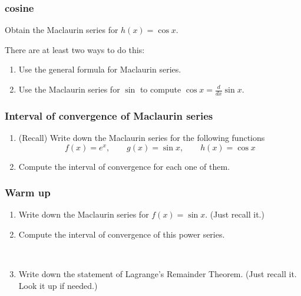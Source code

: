 \documentclass[14pt]{beamer}
\begin{document}
\begin{frame}[t]
	\frametitle{cosine}

	Obtain the Maclaurin series for $h(x) = \cos x$.

	There are at least two ways to do this:
	\vspace{.2cm}
	\begin{enumerate}
		\item Use the general formula for Maclaurin series.
			\vspace{.2cm}

		\item Use the Maclaurin series for $\sin$ to compute $\displaystyle \cos x =
			\frac{d}{dx}\sin x$.
	\end{enumerate}
\end{frame}

\begin{frame}[t]
	\frametitle{Interval of convergence of Maclaurin series}

	\begin{enumerate}
		\item (Recall) Write down the Maclaurin series for the following functions
			\[
				f(x) = e^{x}, \quad \quad g(x) = \sin x, \quad \quad h(x) = \cos x
			\]

		\item Compute the interval of convergence for each one of them.
	\end{enumerate}
\end{frame}

\begin{frame}[t]
	\frametitle{Warm up}

	\begin{enumerate}
		\item Write down the Maclaurin series for $\displaystyle f(x)=\sin x$. (Just
			recall it.)

		\item Compute the interval of convergence of this power series.

			\

		\item Write down the statement of Lagrange's Remainder Theorem. (Just recall
			it. Look it up if needed.)
	\end{enumerate}
\end{frame}
\end{document}

